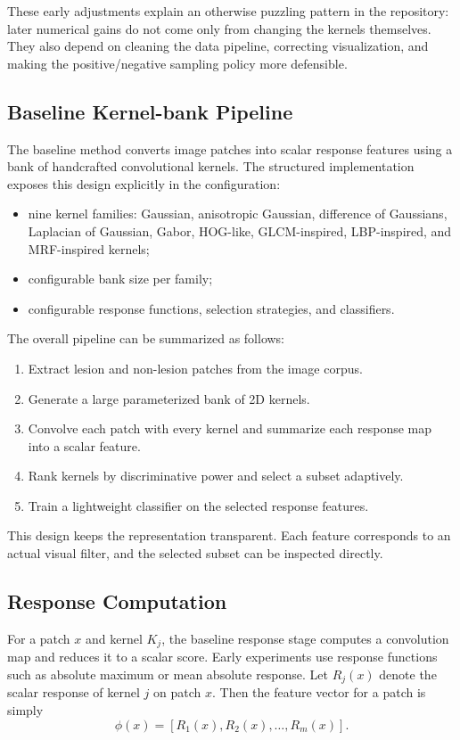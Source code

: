 \documentclass{cernatsnote}
\let\oldsubsection\subsection
\let\oldsubsubsection\subsubsection
\let\section\oldsubsection
\let\subsection\oldsubsubsection
\begin{document}
These early adjustments explain an otherwise puzzling pattern in the repository: later numerical gains do not come only from changing the kernels themselves. They also depend on cleaning the data pipeline, correcting visualization, and making the positive/negative sampling policy more defensible.

\section{Baseline Kernel-bank Pipeline}
The baseline method converts image patches into scalar response features using a bank of handcrafted convolutional kernels. The structured implementation exposes this design explicitly in the configuration:
\begin{itemize}
    \item nine kernel families: Gaussian, anisotropic Gaussian, difference of Gaussians, Laplacian of Gaussian, Gabor, HOG-like, GLCM-inspired, LBP-inspired, and MRF-inspired kernels;
    \item configurable bank size per family;
    \item configurable response functions, selection strategies, and classifiers.
\end{itemize}

The overall pipeline can be summarized as follows:
\begin{enumerate}[label=\arabic*.]
    \item Extract lesion and non-lesion patches from the image corpus.
    \item Generate a large parameterized bank of 2D kernels.
    \item Convolve each patch with every kernel and summarize each response map into a scalar feature.
    \item Rank kernels by discriminative power and select a subset adaptively.
    \item Train a lightweight classifier on the selected response features.
\end{enumerate}

This design keeps the representation transparent. Each feature corresponds to an actual visual filter, and the selected subset can be inspected directly.

\section{Response Computation}
For a patch $x$ and kernel $K_j$, the baseline response stage computes a convolution map and reduces it to a scalar score. Early experiments use response functions such as absolute maximum or mean absolute response. Let $R_j(x)$ denote the scalar response of kernel $j$ on patch $x$. Then the feature vector for a patch is simply
\[
\phi(x) = [R_1(x), R_2(x), \ldots, R_m(x)].
\]
\end{document}
